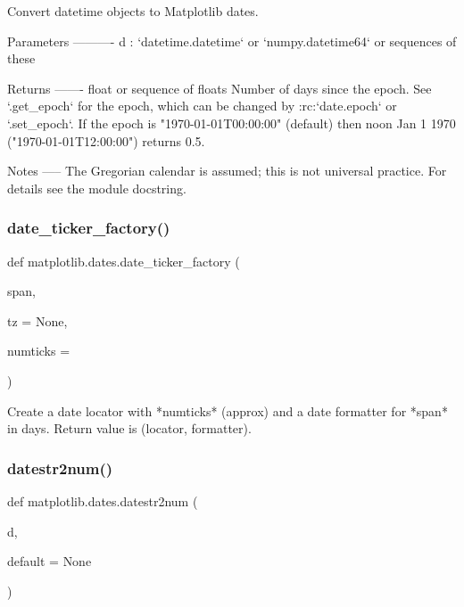 \begin{DoxyVerb}Convert datetime objects to Matplotlib dates.

Parameters
----------
d : `datetime.datetime` or `numpy.datetime64` or sequences of these

Returns
-------
float or sequence of floats
    Number of days since the epoch.  See `.get_epoch` for the
    epoch, which can be changed by :rc:`date.epoch` or `.set_epoch`.  If
    the epoch is "1970-01-01T00:00:00" (default) then noon Jan 1 1970
    ("1970-01-01T12:00:00") returns 0.5.

Notes
-----
The Gregorian calendar is assumed; this is not universal practice.
For details see the module docstring.
\end{DoxyVerb}
 \mbox{\label{namespacematplotlib_1_1dates_a3a32363e47b679988576a4f25a44b314}} 
\subsubsection{\texorpdfstring{date\+\_\+ticker\+\_\+factory()}{date\_ticker\_factory()}}
{\footnotesize\ttfamily def matplotlib.\+dates.\+date\+\_\+ticker\+\_\+factory (\begin{DoxyParamCaption}\item[{}]{span,  }\item[{}]{tz = {\ttfamily None},  }\item[{}]{numticks = {} }\end{DoxyParamCaption})}

\begin{DoxyVerb}Create a date locator with *numticks* (approx) and a date formatter
for *span* in days.  Return value is (locator, formatter).
\end{DoxyVerb}
 \mbox{\label{namespacematplotlib_1_1dates_a1aa957751b42c05fd0545f4eeb9f8b15}} 
\subsubsection{\texorpdfstring{datestr2num()}{datestr2num()}}
{\footnotesize\ttfamily def matplotlib.\+dates.\+datestr2num (\begin{DoxyParamCaption}\item[{}]{d,  }\item[{}]{default = {\ttfamily None} }\end{DoxyParamCaption})}


